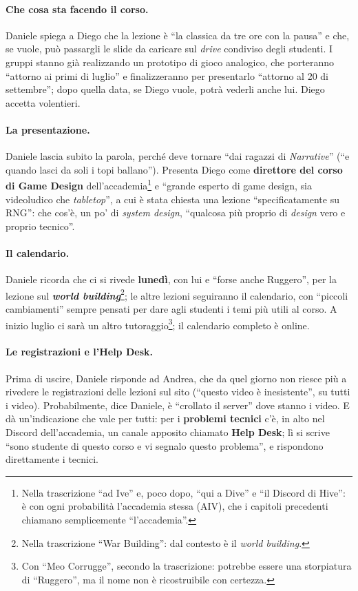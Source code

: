 \paragraph{Che cosa sta facendo il corso.} Daniele spiega a Diego che la lezione è ``la
classica da tre ore con la pausa'' e che, se vuole, può passargli le slide da caricare sul
\emph{drive} condiviso degli studenti. I gruppi stanno già realizzando un prototipo di gioco
analogico, che porteranno ``attorno ai primi di luglio'' e finalizzeranno per presentarlo
``attorno al 20 di settembre''; dopo quella data, se Diego vuole, potrà vederli anche lui.
Diego accetta volentieri.

\paragraph{La presentazione.} Daniele lascia subito la parola, perché deve tornare
``dai ragazzi di \emph{Narrative}'' (``e quando lasci da soli i topi ballano''). Presenta
Diego come \textbf{direttore del corso di Game Design} dell'accademia\footnote{Nella
trascrizione ``ad Ive'' e, poco dopo, ``qui a Dive'' e ``il Discord di Hive'': è con ogni
probabilità l'accademia stessa (AIV), che i capitoli precedenti chiamano semplicemente
``l'accademia''.} e ``grande esperto di game design, sia videoludico che \emph{tabletop}'',
a cui è stata chiesta una lezione ``specificatamente su RNG'': che cos'è, un po' di
\emph{system design}, ``qualcosa più proprio di \emph{design} vero e proprio tecnico''.

\paragraph{Il calendario.} Daniele ricorda che ci si rivede \textbf{lunedì}, con lui e
``forse anche Ruggero'', per la lezione sul \textbf{\emph{world building}}\footnote{Nella
trascrizione ``War Building'': dal contesto è il \emph{world building}.}; le altre lezioni
seguiranno il calendario, con ``piccoli cambiamenti'' sempre pensati per dare agli studenti i
temi più utili al corso. A inizio luglio ci sarà un altro tutoraggio\footnote{Con ``Meo
Corrugge'', secondo la trascrizione: potrebbe essere una storpiatura di ``Ruggero'', ma il
nome non è ricostruibile con certezza.}; il calendario completo è online.

\paragraph{Le registrazioni e l'Help Desk.} Prima di uscire, Daniele risponde ad Andrea, che
da quel giorno non riesce più a rivedere le registrazioni delle lezioni sul sito (``questo
video è inesistente'', su tutti i video). Probabilmente, dice Daniele, è ``crollato il
server'' dove stanno i video. E dà un'indicazione che vale per tutti: per i \textbf{problemi
tecnici} c'è, in alto nel Discord dell'accademia, un canale apposito chiamato \textbf{Help
Desk}; lì si scrive ``sono studente di questo corso e vi segnalo questo problema'', e
rispondono direttamente i tecnici.

